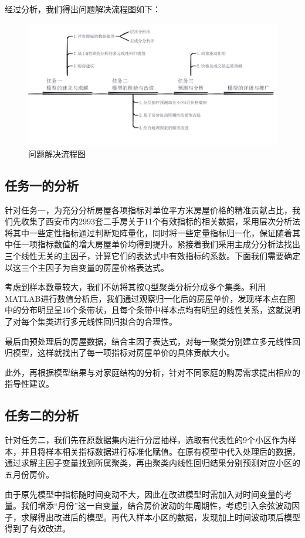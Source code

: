 \documentclass[withoutpreface,bwprint]{cumcmthesis} %
\begin{document}
经过分析，我们得出问题解决流程图如下：
\begin{figure}[H]
    \centering
    \includegraphics[scale=0.45]{流程图.jpg}
    \caption{问题解决流程图}
    \label{fig:问题解决流程图}
\end{figure}

\subsection{任务一的分析}
针对任务一，为充分分析房屋各项指标对单位平方米房屋价格的精准贡献占比，我们先收集了西安市内2993套二手房关于11个有效指标的相关数据，采用层次分析法将其中一些定性指标通过判断矩阵量化，同时将一些定量指标归一化，保证随着其中任一项指标数值的增大房屋单价均得到提升。紧接着我们采用主成分分析法找出三个线性无关的主因子，计算它们的表达式中有效指标的系数。下面我们需要确定以这三个主因子为自变量的房屋价格表达式。

考虑到样本数量较大，我们不妨将其按Q型聚类分析分成多个集类。利用MATLAB进行数值分析后，我们通过观察归一化后的房屋单价，发现样本点在图中的分布明显呈16个条带状，且每个条带中样本点均有明显的线性关系，这就说明了对每个集类进行多元线性回归拟合的合理性。

最后由预处理后的房屋数据，结合主因子表达式，对每一聚类分别建立多元线性回归模型，这样就找出了每一项指标对房屋单价的具体贡献大小。

此外，再根据模型结果与对家庭结构的分析，针对不同家庭的购房需求提出相应的指导性建议。
\subsection{任务二的分析}
针对任务二，我们先在原数据集内进行分层抽样，选取有代表性的9个小区作为样本，并且将样本相关指标数据进行标准化赋值。在原有模型中代入处理后的数据，通过求解主因子变量找到所属聚类，再由聚类内线性回归结果分别预测对应小区的五月份房价。

由于原先模型中指标随时间变动不大，因此在改进模型时需加入对时间变量的考量。我们增添“月份”这一自变量，结合房价波动的年周期性，考虑引入余弦波动因子，求解得出改进后的模型。再代入样本小区的数据，发现加上时间波动项后模型得到了有效改进。
\end{document}
